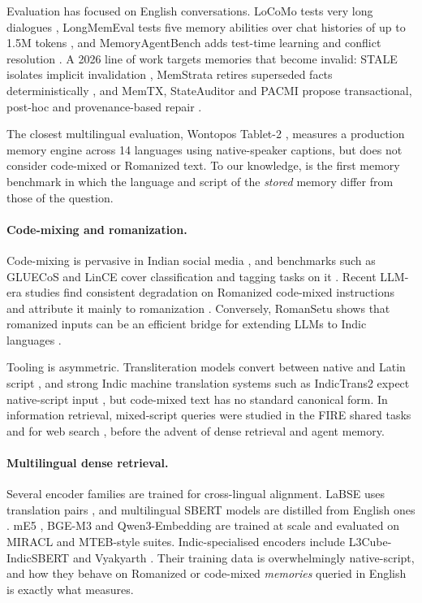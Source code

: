 Evaluation has focused on English conversations. LoCoMo tests very long dialogues \citep{maharana2024locomo}, LongMemEval tests five memory abilities over chat histories of up to 1.5M tokens \citep{wu2025longmemeval}, and MemoryAgentBench adds test-time learning and conflict resolution \citep{hu2026memoryagentbench}. A 2026 line of work targets memories that become invalid: STALE isolates implicit invalidation \citep{chao2026stale}, MemStrata retires superseded facts deterministically \citep{yadav2026memstrata}, and MemTX, StateAuditor and PACMI propose transactional, post-hoc and provenance-based repair \citep{li2026memtx,sun2026stateauditor,liu2026pacmi}.

The closest multilingual evaluation, Wontopos Tablet-2 \citep{kim2026tablet2}, measures a production memory engine across 14 languages using native-speaker captions, but does not consider code-mixed or Romanized text. To our knowledge, \lipi{} is the first memory benchmark in which the language and script of the \emph{stored} memory differ from those of the question.

\paragraph{Code-mixing and romanization.}
Code-mixing is pervasive in Indian social media \citep{bali2014borrowing}, and benchmarks such as GLUECoS and LinCE cover classification and tagging tasks on it \citep{khanuja2020gluecos,aguilar2020lince}. Recent LLM-era studies find consistent degradation on Romanized code-mixed instructions \citep{das2026indiromcom} and attribute it mainly to romanization \citep{codemixtax2026}. Conversely, RomanSetu shows that romanized inputs can be an efficient bridge for extending LLMs to Indic languages \citep{husain2024romansetu}.

Tooling is asymmetric. Transliteration models convert between native and Latin script \citep{madhani2023aksharantar}, and strong Indic machine translation systems such as IndicTrans2 expect native-script input \citep{gala2023indictrans2}, but code-mixed text has no standard canonical form. In information retrieval, mixed-script queries were studied in the FIRE shared tasks and for web search \citep{gupta2014mixedscript}, before the advent of dense retrieval and agent memory.

\paragraph{Multilingual dense retrieval.}
Several encoder families are trained for cross-lingual alignment. LaBSE uses translation pairs \citep{feng2022labse}, and multilingual SBERT models are distilled from English ones \citep{reimers2020multilingual}. mE5 \citep{wang2024me5}, BGE-M3 \citep{chen2024bgem3} and Qwen3-Embedding \citep{zhang2025qwen3embedding} are trained at scale and evaluated on MIRACL \citep{zhang2023miracl} and MTEB-style suites. Indic-specialised encoders include L3Cube-IndicSBERT \citep{deode2023indicsbert} and Vyakyarth \citep{krutrim2025vyakyarth}. Their training data is overwhelmingly native-script, and how they behave on Romanized or code-mixed \emph{memories} queried in English is exactly what \lipi{} measures.

